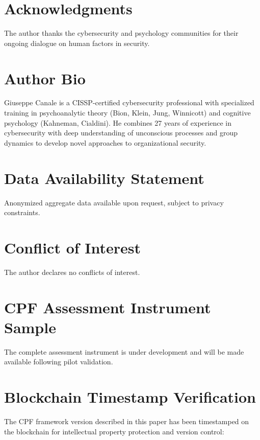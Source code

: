 \documentclass[11pt,a4paper]{article}
\begin{document}
\section*{Acknowledgments}

The author thanks the cybersecurity and psychology communities for their ongoing dialogue on human factors in security.

\section*{Author Bio}

Giuseppe Canale is a CISSP-certified cybersecurity professional with 
specialized training in psychoanalytic theory (Bion, Klein, Jung, 
Winnicott) and cognitive psychology (Kahneman, Cialdini). He combines 
27 years of experience in cybersecurity with deep understanding of 
unconscious processes and group dynamics to develop novel approaches 
to organizational security.

\section*{Data Availability Statement}

Anonymized aggregate data available upon request, subject to privacy constraints.

\section*{Conflict of Interest}

The author declares no conflicts of interest.

\appendix

\section{CPF Assessment Instrument Sample}
\label{app:instrument}

The complete assessment instrument is under development and will be made available following pilot validation.

\section{Blockchain Timestamp Verification}
\label{app:blockchain}

The CPF framework version described in this paper has been timestamped on the blockchain for intellectual property protection and version control:
\end{document}
